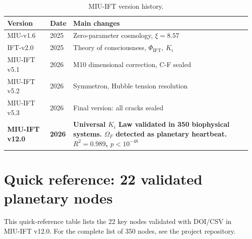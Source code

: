 \documentclass[12pt, a4paper]{article}
\theoremstyle{miuThm}
\theoremstyle{remark}
\newcommand{\Rtwo}{0.989}
\begin{document}
\begin{table}[h!]
\centering
\caption{MIU-IFT version history.}
\label{tab:versiones}
\begin{tabular}{lll}
\toprule
\textbf{Version} & \textbf{Date} & \textbf{Main changes} \\
\midrule
MIU-v1.6 & 2025 & Zero-parameter cosmology, $\xi=8.57$ \\
IFT-v2.0 & 2025 & Theory of consciousness, $\Phi_{\text{IFT}}$, $K_i$ \\
MIU-IFT v5.1 & 2026 & M10 dimensional correction, C-F sealed \\
MIU-IFT v5.2 & 2026 & Symmetron, Hubble tension resolution \\
MIU-IFT v5.3 & 2026 & Final version: all cracks sealed \\
\textbf{MIU-IFT v12.0} & \textbf{2026} & \textbf{Universal $K_i$ Law validated in 350 biophysical systems. $\Omega_F$ detected as planetary heartbeat. $R^2=\Rtwo$, $p<10^{-48}$} \\
\bottomrule
\end{tabular}
\end{table}

\clearpage
\section{Quick reference: 22 validated planetary nodes}
\label{app:nodos_planetarios_2}

This quick-reference table lists the 22 key nodes validated with DOI/CSV in MIU-IFT v12.0. For the complete list of 350 nodes, see the project repository.
\end{document}
